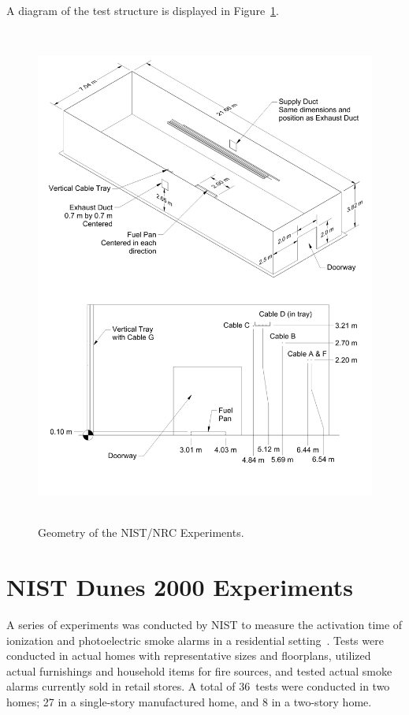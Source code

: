 A diagram of the test structure is displayed in Figure~\ref{NIST_NRC_Drawing}.

\begin{figure}
\begin{center}
\includegraphics[height=6.5in]{FIGURES/NIST_NRC/NIST_NRC_Drawing}
\end{center}
\caption{Geometry of the NIST/NRC Experiments.}
\label{NIST_NRC_Drawing}
\end{figure}


\clearpage

\section{NIST Dunes 2000 Experiments}

A series of experiments was conducted by NIST to measure the activation time of ionization and photoelectric
smoke alarms in a residential setting~\cite{Bukowski:1}. Tests were conducted in actual homes with
representative sizes and floorplans, utilized actual furnishings and household items for fire sources,
and tested actual smoke alarms currently sold in retail stores. A total of 36~tests were conducted in two
homes; 27 in a single-story manufactured home, and 8 in a two-story home.

